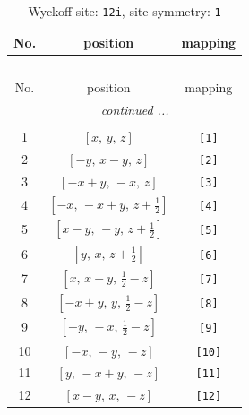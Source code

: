 \documentclass[fleqn,8pt]{jsarticle}
\begin{document}
\renewcommand{\arraystretch}{1.2}
\begin{longtable}{ccc}
\caption{Wyckoff site: {\tt 12i}, site symmetry: {\tt 1}}
 \\
 \hline \hline
No. & position & mapping \\ \hline \endfirsthead

\multicolumn{2}{l}{\tablename\ \thetable{}} \\
 \hline \hline
No. & position & mapping \\ \hline \endhead

 \hline \hline
\multicolumn{2}{r}{\footnotesize\it continued ...} \\ \endfoot

 \hline \hline
\multicolumn{2}{r}{} \\ \endlastfoot

1 & $\left[ x,\, y,\, z \right]$ & {\tt [1]} \\ \hline
2 & $\left[ - y,\, x - y,\, z \right]$ & {\tt [2]} \\ \hline
3 & $\left[ - x + y,\, - x,\, z \right]$ & {\tt [3]} \\ \hline
4 & $\left[ - x,\, - x + y,\, z + \frac{1}{2} \right]$ & {\tt [4]} \\ \hline
5 & $\left[ x - y,\, - y,\, z + \frac{1}{2} \right]$ & {\tt [5]} \\ \hline
6 & $\left[ y,\, x,\, z + \frac{1}{2} \right]$ & {\tt [6]} \\ \hline
7 & $\left[ x,\, x - y,\, \frac{1}{2} - z \right]$ & {\tt [7]} \\ \hline
8 & $\left[ - x + y,\, y,\, \frac{1}{2} - z \right]$ & {\tt [8]} \\ \hline
9 & $\left[ - y,\, - x,\, \frac{1}{2} - z \right]$ & {\tt [9]} \\ \hline
10 & $\left[ - x,\, - y,\, - z \right]$ & {\tt [10]} \\ \hline
11 & $\left[ y,\, - x + y,\, - z \right]$ & {\tt [11]} \\ \hline
12 & $\left[ x - y,\, x,\, - z \right]$ & {\tt [12]} \\
\end{longtable}
\end{document}
